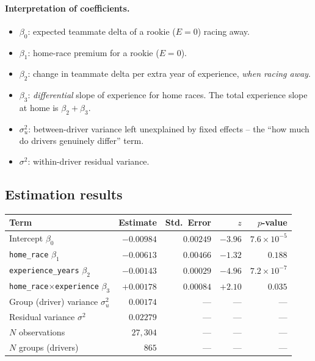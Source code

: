 \documentclass[11pt,a4paper]{article}
\newcommand{\code}[1]{\texttt{\small #1}}
\begin{document}
\paragraph{Interpretation of coefficients.}
\begin{itemize}[leftmargin=*]
    \item $\beta_0$: expected teammate delta of a rookie ($E=0$) racing away.
    \item $\beta_1$: home-race premium for a rookie ($E=0$).
    \item $\beta_2$: change in teammate delta per extra year of experience,
    \emph{when racing away}.
    \item $\beta_3$: \emph{differential} slope of experience for home races.
    The total experience slope at home is $\beta_2+\beta_3$.
    \item $\sigma_u^2$: between-driver variance left unexplained by fixed
    effects -- the ``how much do drivers genuinely differ'' term.
    \item $\sigma^2$: within-driver residual variance.
\end{itemize}

\subsection{Estimation results}

\begin{center}
\renewcommand{\arraystretch}{1.15}
\begin{tabular}{lrrrr}
\toprule
Term & Estimate & Std.\ Error & $z$ & $p$-value \\
\midrule
Intercept $\beta_0$                     & $-0.00984$ & $0.00249$ & $-3.96$ & $7.6\times 10^{-5}$ \\
\code{home\_race} $\beta_1$             & $-0.00613$ & $0.00466$ & $-1.32$ & $0.188$ \\
\code{experience\_years} $\beta_2$      & $-0.00143$ & $0.00029$ & $-4.96$ & $7.2\times 10^{-7}$ \\
\code{home\_race$\times$experience} $\beta_3$
                                        & $+0.00178$ & $0.00084$ & $+2.10$ & $0.035$ \\
\midrule
Group (driver) variance $\sigma_u^2$    & $0.00174$ & --- & --- & --- \\
Residual variance $\sigma^2$            & $0.02279$ & --- & --- & --- \\
$N$ observations                        & $27{,}304$ & --- & --- & --- \\
$N$ groups (drivers)                    & $865$      & --- & --- & --- \\
\bottomrule
\end{tabular}
\end{center}
\end{document}

